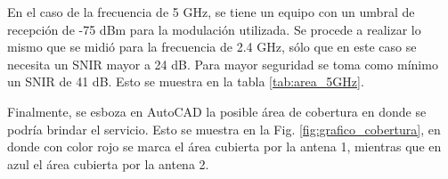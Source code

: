 \documentclass[11pt,a4paper]{article}
\begin{document}
\begin{table}[htbp]
\caption{posible área de cobertura del servicio para 2.4 GHz.}
\label{tab:area_24GHz}
\end{table}


En el caso de la frecuencia de 5 GHz, se tiene un equipo con un umbral de recepción de -75 dBm para la modulación utilizada. 
Se procede a realizar lo mismo que se midió para la frecuencia de 2.4 GHz, sólo que en este caso se necesita un SNIR mayor a 24 dB. 
Para mayor seguridad se toma como mínimo un SNIR de 41 dB.  
Esto se muestra en la tabla \ref{tab:area_5GHz}.

\begin{table}[htbp]
\caption{Posible área de cobertura del servicio para 5 GHz.}
\label{tab:area_5GHz}
\end{table}

Finalmente, se esboza en AutoCAD la posible área de cobertura en donde se podría brindar el servicio. 
Esto se muestra en la Fig. \ref{fig:grafico_cobertura}, en donde con color rojo se marca el área cubierta por la antena 1, mientras que en azul el área cubierta por la antena 2.
\end{document}
